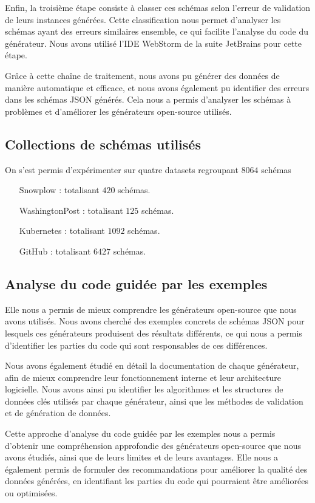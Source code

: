 \documentclass{article}
\begin{document}
Enfin, la troisième étape consiste à classer ces schémas selon l'erreur de validation de leurs instances générées. Cette classification nous permet d'analyser les schémas ayant des erreurs similaires ensemble, ce qui facilite l'analyse du code du générateur. Nous avons utilisé l'IDE WebStorm de la suite JetBrains pour cette étape.

Grâce à cette chaîne de traitement, nous avons pu générer des données de manière automatique et efficace, et nous avons également pu identifier des erreurs dans les schémas JSON générés. Cela nous a permis d'analyser les schémas à problèmes et d'améliorer les générateurs open-source utilisés.
    
    \subsection{Collections de schémas utilisés}
On s'est permis d'expérimenter sur quatre datasets regroupant $8064$ schémas\\
\begin{itemize}
\item[Snowplow :] totalisant $420$ schémas.
\item[WashingtonPost :] totalisant $125$ schémas.
\item[Kubernetes :] totalisant $1092$ schémas.
\item[GitHub :] totalisant $6427$ schémas.
\end{itemize}
    
    
    \subsection{Analyse du code guidée par les exemples}

Elle nous a permis de mieux comprendre les générateurs open-source que nous avons utilisés. Nous avons cherché des exemples concrets de schémas JSON pour lesquels ces générateurs produisent des résultats différents, ce qui nous a permis d'identifier les parties du code qui sont responsables de ces différences.

Nous avons également étudié en détail la documentation de chaque générateur, afin de mieux comprendre leur fonctionnement interne et leur architecture logicielle. Nous avons ainsi pu identifier les algorithmes et les structures de données clés utilisés par chaque générateur, ainsi que les méthodes de validation et de génération de données.

Cette approche d'analyse du code guidée par les exemples nous a permis d'obtenir une compréhension approfondie des générateurs open-source que nous avons étudiés, ainsi que de leurs limites et de leurs avantages. Elle nous a également permis de formuler des recommandations pour améliorer la qualité des données générées, en identifiant les parties du code qui pourraient être améliorées ou optimisées.
\end{document}
